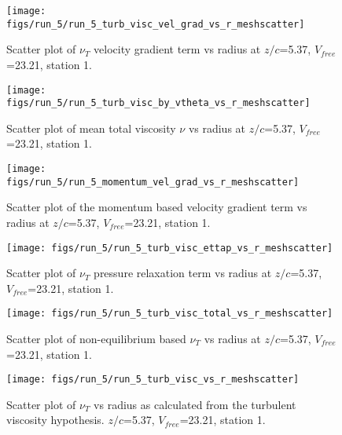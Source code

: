 \begin{figure}[H]
\centering
\texttt{[image: figs/run\_5/run\_5\_turb\_visc\_vel\_grad\_vs\_r\_meshscatter]}
\caption{Scatter plot of $\nu_T$ velocity gradient term vs radius at $z/c$=5.37, $V_{free}$=23.21, station 1.}
\end{figure}


\begin{figure}[H]
\centering
\texttt{[image: figs/run\_5/run\_5\_turb\_visc\_by\_vtheta\_vs\_r\_meshscatter]}
\caption{Scatter plot of mean total viscosity $\nu$ vs radius at $z/c$=5.37, $V_{free}$=23.21, station 1.}
\end{figure}


\begin{figure}[H]
\centering
\texttt{[image: figs/run\_5/run\_5\_momentum\_vel\_grad\_vs\_r\_meshscatter]}
\caption{Scatter plot of the momentum based velocity gradient term vs radius at $z/c$=5.37, $V_{free}$=23.21, station 1.}
\end{figure}


\begin{figure}[H]
\centering
\texttt{[image: figs/run\_5/run\_5\_turb\_visc\_ettap\_vs\_r\_meshscatter]}
\caption{Scatter plot of $\nu_T$ pressure relaxation term vs radius at $z/c$=5.37, $V_{free}$=23.21, station 1.}
\end{figure}


\begin{figure}[H]
\centering
\texttt{[image: figs/run\_5/run\_5\_turb\_visc\_total\_vs\_r\_meshscatter]}
\caption{Scatter plot of non-equilibrium based $\nu_T$ vs radius at $z/c$=5.37, $V_{free}$=23.21, station 1.}
\end{figure}


\begin{figure}[H]
\centering
\texttt{[image: figs/run\_5/run\_5\_turb\_visc\_vs\_r\_meshscatter]}
\caption{Scatter plot of $\nu_T$ vs radius as calculated from the turbulent viscosity hypothesis. $z/c$=5.37, $V_{free}$=23.21, station 1.}
\end{figure}


